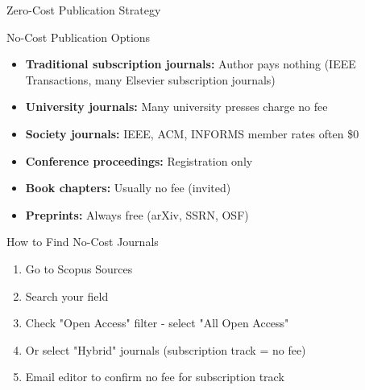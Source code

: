 \documentclass[11pt]{beamer}
\begin{document}
	\begin{frame}{Zero-Cost Publication Strategy}
		\scriptsize
		\begin{block}{No-Cost Publication Options}
			\begin{itemize}
				\item \textbf{Traditional subscription journals:} Author pays nothing (IEEE Transactions, many Elsevier subscription journals)
				\item \textbf{University journals:} Many university presses charge no fee
				\item \textbf{Society journals:} IEEE, ACM, INFORMS member rates often \$0
				\item \textbf{Conference proceedings:} Registration only
				\item \textbf{Book chapters:} Usually no fee (invited)
				\item \textbf{Preprints:} Always free (arXiv, SSRN, OSF)
			\end{itemize}
		\end{block}
		\begin{block}{How to Find No-Cost Journals}
			\begin{enumerate}
				\item Go to Scopus Sources
				\item Search your field
				\item Check "Open Access" filter - select "All Open Access"
				\item Or select "Hybrid" journals (subscription track = no fee)
				\item Email editor to confirm no fee for subscription track
			\end{enumerate}
		\end{block}
	\end{frame}
	
\end{document}
